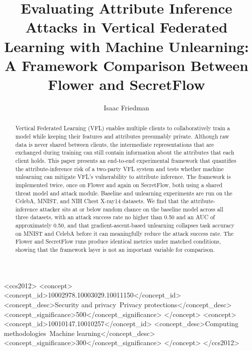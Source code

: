 \documentclass[sigconf,anonymous]{acmart}
\begin{document}
\title[Attribute Inference and Unlearning in VFL: Flower vs. SecretFlow]{Evaluating Attribute Inference Attacks in Vertical Federated Learning with Machine Unlearning: A Framework Comparison Between Flower and SecretFlow}

\author{Isaac Friedman}

\renewcommand{\shortauthors}{Friedman}

\begin{abstract}
Vertical Federated Learning (VFL) enables multiple clients to collaboratively train a model while keeping their features and attributes presumably private. Although raw data is never shared between clients, the intermediate representations that are exchanged during training can still contain information about the attributes that each client holds. This paper presents an end-to-end experimental framework that quantifies the attribute-inference risk of a two-party VFL system and tests whether machine unlearning can mitigate VFL's vulnerability to attribute inference. The framework is implemented twice, once on Flower and again on SecretFlow, both using a shared threat model and attack module. Baseline and unlearning experiments are run on the CelebA, MNIST, and NIH Chest X-ray14 datasets. We find that the attribute-inference attacker sits at or below random chance on the baseline model across all three datasets, with an attack success rate no higher than 0.50 and an AUC of approximately 0.50, and that gradient-ascent-based unlearning collapses task accuracy on MNIST and CelebA before it can meaningfully reduce the attack success rate. The Flower and SecretFlow runs produce identical metrics under matched conditions, showing that the framework layer is not an important variable for comparison.
\end{abstract}

\begin{CCSXML}
<ccs2012>
   <concept>
       <concept_id>10002978.10003029.10011150</concept_id>
       <concept_desc>Security and privacy~Privacy protections</concept_desc>
       <concept_significance>500</concept_significance>
       </concept>
   <concept>
       <concept_id>10010147.10010257</concept_id>
       <concept_desc>Computing methodologies~Machine learning</concept_desc>
       <concept_significance>300</concept_significance>
       </concept>
 </ccs2012>
\end{CCSXML}
\end{document}
